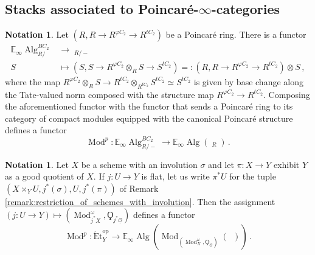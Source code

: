 \documentclass{article}
\DeclareMathOperator{\Alg}{Alg} %
\DeclareMathOperator{\CAlgp}{CAlg^p} %
\DeclareMathOperator{\Catpidem}{Cat^p_{\infty, idem}} %
\DeclareMathOperator{\Mod}{Mod} %
\newcommand{\EE}{\mathbb{E}}
\newcommand{\op}{\mathrm{op}} %
\theoremstyle{definition}
\newtheorem{notation}[equation]{Notation}
\begin{document}
\subsection{Stacks associated to Poincaré-\texorpdfstring{$ \infty $}{∞}-categories}
\begin{notation}\label{notation:poincare_ring_basechange}
    Let $ (R, R\to R^{\varphi C_2} \to R^{tC_2}) $ be a Poincaré ring. 
    There is a functor 
    \begin{equation*}
    \begin{split}
        \EE_\infty\Alg^{BC_2}_{R/} &\to \CAlgp_{R/-} \\
        S & \mapsto (S, S \to R^{\varphi C_2} \otimes_{R} S \to S^{t C_2}) =: (R, R \to R^{\varphi C_2} \to R^{tC_2}) \otimes S \,,
    \end{split}    
    \end{equation*}
    where the map $ R^{\varphi C_2} \otimes_R S \to R^{tC_2} \otimes_{R^{tC_2}} S^{tC_2} \simeq S^{tC_2} $ is given by base change along the Tate-valued norm composed with the structure map $ R^{\varphi C_2} \to R^{tC_2} $. 
    Composing the aforementioned functor with the functor that sends a Poincaré ring to its category of compact modules equipped with the canonical Poincaré structure defines a functor
    \begin{equation*}
        \Mod^p \colon \EE_\infty\Alg^{BC_2}_{R/-} \to \EE_\infty\Alg\left(\Catpidem_{R}\right) \,.
    \end{equation*}
\end{notation}
\begin{notation}\label{notation:scheme_involution_basechange}
    Let $ X $ be a scheme with an involution $ \sigma $ and let $ \pi \colon X \to Y $ exhibit $ Y $ as a good quotient of $ X $. 
    If $ j \colon U \to Y $ is flat, let us write $ \pi^*U $ for the tuple $ (X \times_Y U, j^*(\sigma), U, j^*(\pi)) $ of Remark \ref{remark:restriction_of_schemes_with_involution}. 
    Then the assignment $ (j \colon U \to Y ) \mapsto \left(\Mod^\omega_{j^*X}, \Qoppa_{j^*\underline{\mathcal{O}}}\right) $ defines a functor %
    \begin{equation*}
        \Mod^p \colon \mathrm{\acute{E}t}_Y^\op \to \EE_\infty \Alg\left(\Mod_{\left(\Mod^\omega_X, \Qoppa_{\underline{\mathcal{O}}}\right)}(\Catpidem)\right) \,.
    \end{equation*}
\end{notation}
\end{document}
